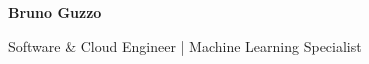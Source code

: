 \documentclass[10pt, a4paper]{article}
\begin{document}

\begin{center}
    {\Huge\bfseries Bruno Guzzo} %
    \vspace{4pt}
    \par
    {\Large Software \& Cloud Engineer | Machine Learning Specialist} %
\end{center}
\vspace{8pt}

\end{document}
